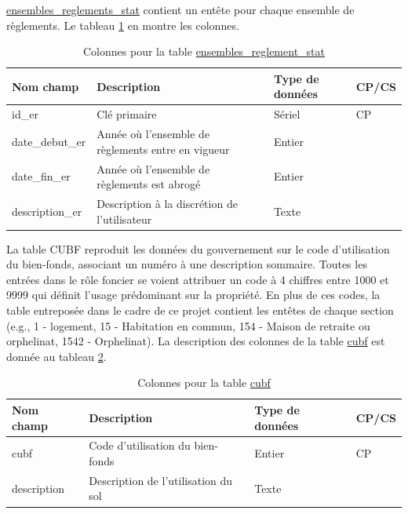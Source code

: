             \underline{ensembles\_reglements\_stat} contient un entête pour chaque ensemble de règlements. Le tableau \ref{tab:definition_er} en montre les colonnes. \par
            \begin{table}[h]
                \caption{Colonnes pour la table \underline{ensembles\_reglement\_stat}}
                \label{tab:definition_er}
                \centering
                \begin{tabular}{m{}|m{}m{}m{}}
                        \hline
                        Nom champ & Description & Type de données & CP/CS  \\
                        \hline
                        id\_er & Clé primaire  & Sériel & CP \\  
                        date\_debut\_er & Année où l'ensemble de règlements entre en vigueur & Entier & \\
                        date\_fin\_er & Année où l'ensemble de règlements est abrogé & Entier & \\
                        description\_er & Description à la discrétion de l'utilisateur & Texte & \\
                        \hline
                \end{tabular}
            \end{table}   
            La table \ac{CUBF} reproduit les données du gouvernement sur le code d'utilisation du bien-fonds, associant un numéro à une description sommaire. Toutes les entrées dans le rôle foncier se voient attribuer un code à 4 chiffres entre 1000 et 9999 qui définit l'usage prédominant sur la propriété. En plus de ces codes, la table entreposée dans le cadre de ce projet contient les entêtes de chaque section (e.g., 1 - logement, 15 - Habitation en commun, 154 - Maison de retraite ou orphelinat, 1542 - Orphelinat). La description des colonnes de la table \underline{cubf} est donnée au tableau \ref{tab:definition_cubf}. \par
            \begin{table}[h]
                \caption{Colonnes pour la table \underline{cubf}}
            \label{tab:definition_cubf}
            \centering
            \begin{tabular}{m{}|m{}m{}m{}}
                    \hline
                    Nom champ & Description & Type de données & CP/CS  \\
                    \hline
                    cubf & Code d'utilisation du bien-fonds & Entier & CP \\  
                    description & Description de l'utilisation du sol & Texte & \\
                    \hline
            \end{tabular}
            
            \end{table}   
